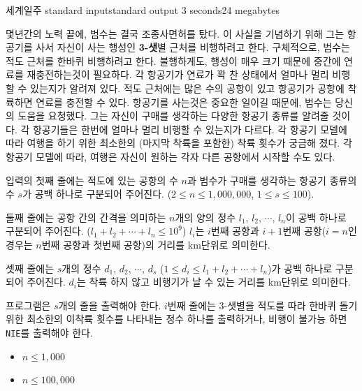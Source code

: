 \begin{problem}{세계일주}
	{standard input}{standard output}
	{3 seconds}{24 megabytes}{}
	
	몇년간의 노력 끝에, 범수는 결국 조종사면허를 탔다. 이 사실을 기념하기 위해 그는 항공기를 사서 자신이 사는 행성인 \textbf{3-샛}별 근처를 비행하려고 한다. 구체적으로, 범수는 적도 근처를 한바퀴 비행하려고 한다. 불행하게도, 행성이 매우 크기 때문에 중간에 연료를 재충전하는것이 필요하다. 각 항공기가 연료가 꽉 찬 상태에서 얼마나 멀리 비행할 수 있는지가 알려져 있다. 적도 근처에는 많은 수의 공항이 있고 항공기가 공항에 착륙하면 연료를 충전할 수 있다. 항공기를 사는것은 중요한 일이길 때문에, 범수는 당신의 도움을 요청했다. 그는 자신이 구매를 생각하는 다양한 항공기 종류를 알려줄 것이다. 각 항공기들은 한번에 얼마나 멀리 비행할 수 있는지가 다르다. 각 항공기 모델에 따라 여행을 하기 위한 최소한의 (마지막 착륙을 포함한) 착륙 횟수가 궁금해 졌다. 각 항공기 모델에 따라, 여행은 자신이 원하는 각자 다른 공항에서 시작할 수도 있다.
	
	\InputFile
	
	입력의 첫째 줄에는 적도에 있는 공항의 수 $n$과 범수가 구매를 생각하는 항공기 종류의 수 $s$가 공백 하나로 구분되어 주어진다. ($2 \le n \le 1,000,000$, $1 \le s \le 100$).
	
	둘째 줄에는 공항 간의 간격을 의미하는 $n$개의 양의 정수 $l_1$, $l_2$, $\cdots$, $l_n$이 공백 하나로 구분되어 주어진다. ($l_1 + l_2 + \cdots + l_n \le 10^9$) $l_i$는 $i$번째 공항과 $i+1$번째 공항($i = n$인 경우는 $n$번째 공항과 첫번째 공항)의 거리를 km단위로 의미한다.
	
	셋째 줄에는 $s$개의 정수 $d_1$, $d_2$, $\cdots$, $d_s$ ($1 \le d_i \le l_1 + l_2 + \cdots + l_n$)가 공백 하나로 구분되어 주어진다. $d_i$는 착륙 하지 않고 비행기가 날 수 있는 거리를 km단위로 의미한다.
	
	
	
	\OutputFile
	
	프로그램은 $s$개의 줄을 출력해야 한다. $i$번째 줄에는 3-샛별을 적도를 따라 한바퀴 돌기 위한 최소한의 이착륙 횟수를 나타내는 정수 하나를 출력하거나, 비행이 불가능 하면 \texttt{NIE}를 출력해야 한다.
	
	\begin{itemize}
		\item $n \le 1,000$
	\end{itemize}
	
	\begin{itemize}
		\item $n \le 100,000$
	\end{itemize}
	

\end{problem}
